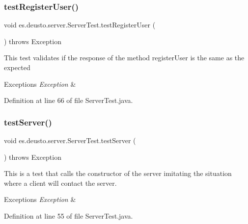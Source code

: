\subsubsection{\texorpdfstring{test\+Register\+User()}{testRegisterUser()}}
{\footnotesize\ttfamily void es.\+deusto.\+server.\+Server\+Test.\+test\+Register\+User (\begin{DoxyParamCaption}{ }\end{DoxyParamCaption}) throws Exception}

This test validates if the response of the method register\+User is the same as the expected 
\begin{DoxyExceptions}{Exceptions}
{\em Exception} & \\
\hline
\end{DoxyExceptions}


Definition at line 66 of file Server\+Test.\+java.

\mbox{\label{classes_1_1deusto_1_1server_1_1_server_test_a9c697e77e1422a1d0835f6e6a38036f4}} 
\subsubsection{\texorpdfstring{test\+Server()}{testServer()}}
{\footnotesize\ttfamily void es.\+deusto.\+server.\+Server\+Test.\+test\+Server (\begin{DoxyParamCaption}{ }\end{DoxyParamCaption}) throws Exception}

This is a test that calls the constructor of the server imitating the situation where a client will contact the server. 
\begin{DoxyExceptions}{Exceptions}
{\em Exception} & \\
\hline
\end{DoxyExceptions}


Definition at line 55 of file Server\+Test.\+java.

\mbox{\label{classes_1_1deusto_1_1server_1_1_server_test_ade86728a524037a1712106cd4741c690}} 
